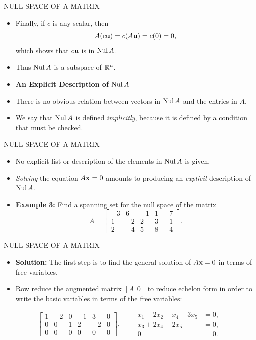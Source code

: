 \begin{frame}[shrink=10]{NULL SPACE OF A MATRIX}
\begin{itemize}
\item Finally, if $c$ is any scalar, then
\[
A(c\mathbf{u})=c(A\mathbf{u})=c(0)=0,
\]
which shows that $c\mathbf{u}$ is in $\operatorname{Nul} A$.
\item Thus $\operatorname{Nul} A$ is a subspace of $\mathbb{R}^n$.
\item \textbf{An Explicit Description of $\operatorname{Nul} A$}
\item There is no obvious relation between vectors in $\operatorname{Nul} A$ and the entries in $A$.
\item We say that $\operatorname{Nul} A$ is defined \emph{implicitly}, because it is defined by a condition that must be checked.
\end{itemize}
\end{frame}

\begin{frame}[shrink=10]{NULL SPACE OF A MATRIX}
\begin{itemize}
\item No explicit list or description of the elements in $\operatorname{Nul} A$ is given.
\item \emph{Solving} the equation $A\mathbf{x}=0$ amounts to producing an \emph{explicit} description of $\operatorname{Nul} A$.
\item \textbf{Example 3:} Find a spanning set for the null space of the matrix
\[
A=\begin{bmatrix}
-3&6&-1&1&-7\\
1&-2&2&3&-1\\
2&-4&5&8&-4
\end{bmatrix}.
\]
\end{itemize}
\end{frame}

\begin{frame}[shrink=15]{NULL SPACE OF A MATRIX}
\begin{itemize}
\item \textbf{Solution:} The first step is to find the general solution of $A\mathbf{x}=0$ in terms of free variables.
\item Row reduce the augmented matrix $[A\ \ 0]$ to reduce echelon form in order to write the basic variables in terms of the free variables:
\end{itemize}
\[
\begin{bmatrix}
1&-2&0&-1&3&0\\
0&0&1&2&-2&0\\
0&0&0&0&0&0
\end{bmatrix},
\qquad
\begin{aligned}
x_1-2x_2-x_4+3x_5&=0,\\
x_3+2x_4-2x_5&=0,\\
0&=0.
\end{aligned}
\]
\end{frame}

